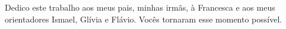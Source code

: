 
\begin{dedicatoria}

Dedico este trabalho aos meus pais, minhas irmãs, à Francesca e aos meus orientadores Ismael,
Glívia e Flávio. Vocês tornaram esse momento possível.

\end{dedicatoria}
